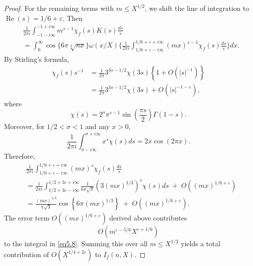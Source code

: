 \documentclass[10pt,leqno]{amsart}
\numberwithin{equation}{section}
\begin{document}
\begin{proof}
For the remaining terms with $m \le X^{1/2}$, we shift the line of integration to $\operatorname{Re}(s) = 1/6 + \varepsilon$. Then
\begin{equation}\label{eq5.8}
\begin{aligned}
&\frac{1}{2\pi i} \int_{-1-i\infty}^{-1+i\infty} m^{s-1} \chi_f(s) K(s)   \frac{ds}{s} \\
&= \int_0^{\infty} \cos\{6\pi\sqrt[3]{nx}\}   \omega(x/X) \Bigg\{ \frac{1}{2\pi i} \int_{1/6+\varepsilon-i\infty}^{1/6+\varepsilon+i\infty} (mx)^{s-1} \chi_f(s)   \frac{ds}{s} \Bigg\} dx.
\end{aligned}
\end{equation}
By Stirling's formula,
\[
\begin{aligned}
\chi_f(s) s^{-1} &= \frac{1}{2\pi}   3^{3s-1/2}   \chi(3s) \left\{ 1 + O \left(|s|^{-1}\right) \right\} \\
&= \frac{1}{2\pi}   3^{3s-1/2}   \chi(3s) + O \left( |s|^{-1-\varepsilon} \right),
\end{aligned}
\]
where
\[
\chi(s) = 2^s \pi^{ s-1} \sin \left( \frac{\pi s}{2} \right) \Gamma(1-s).
\]
Moreover, for $1/2 < \sigma < 1$ and any $x>0$,
\[
\frac{1}{2\pi i} \int_{\sigma-i\infty}^{\sigma+i\infty} x^s   \chi(s)   ds = 2x \cos(2\pi x).
\]
Therefore,
\[
\begin{aligned}
&\frac{1}{2\pi i} \int_{1/6+\varepsilon-i\infty}^{1/6+\varepsilon+i\infty} (mx)^s   \chi_f(s)   \frac{ds}{s} \\
&= \frac{1}{2\pi i} \int_{1/2+3\varepsilon-i\infty}^{1/2+3\varepsilon+i\infty} \frac{1}{6\pi\sqrt{3}} \left( 3(mx)^{1/3} \right)^{ s} \chi(s)   ds \;+\; O \left( (mx)^{1/6+\varepsilon} \right) \\
&= \frac{(mx)^{1/3}}{\pi\sqrt{3}} \cos \left\{ 6\pi (mx)^{1/3} \right\} \;+\; O \left( (mx)^{1/6+\varepsilon} \right).
\end{aligned}
\]
The error term $O \left((mx)^{1/6+\varepsilon}\right)$ derived above contributes
\[
O \left( m^{\varepsilon-5/6} X^{\varepsilon+1/6} \right)
\]
to the integral in \eqref{eq5.8}. Summing this over all $m \le X^{1/2}$ yields a total contribution of $O \left(X^{1/4+2\varepsilon}\right)$ to $I_f(n, X)$.


\end{proof}
\end{document}
